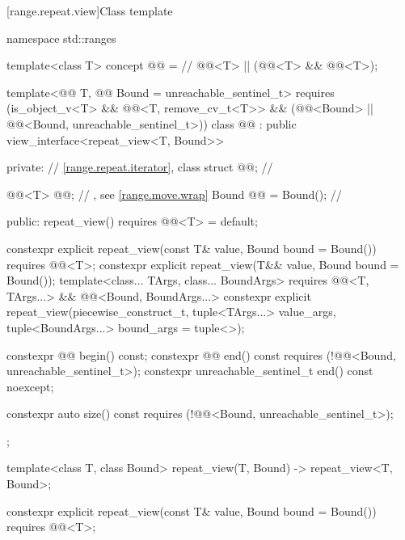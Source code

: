 [range.repeat.view]{Class template }

\begin{codeblock}
namespace std::ranges {
  template<class T>
    concept @@ =  // \expos
      @@<T> || (@@<T> && @@<T>);

  template<@@ T, @@ Bound = unreachable_sentinel_t>
    requires (is_object_v<T> && @@<T, remove_cv_t<T>> &&
              (@@<Bound> ||
               @@<Bound, unreachable_sentinel_t>))
  class @@ : public view_interface<repeat_view<T, Bound>> {
  private:
    // \ref{range.repeat.iterator}, class 
    struct @@;                            // \expos

    @@<T> @@;                      // \expos, see \ref{range.move.wrap}
    Bound @@ = Bound();                     // \expos

  public:
    repeat_view() requires @@<T> = default;

    constexpr explicit repeat_view(const T& value, Bound bound = Bound())
      requires @@<T>;
    constexpr explicit repeat_view(T&& value, Bound bound = Bound());
    template<class... TArgs, class... BoundArgs>
      requires @@<T, TArgs...> &&
               @@<Bound, BoundArgs...>
    constexpr explicit repeat_view(piecewise_construct_t,
      tuple<TArgs...> value_args, tuple<BoundArgs...> bound_args = tuple<>{});

    constexpr @@ begin() const;
    constexpr @@ end() const requires (!@@<Bound, unreachable_sentinel_t>);
    constexpr unreachable_sentinel_t end() const noexcept;

    constexpr auto size() const requires (!@@<Bound, unreachable_sentinel_t>);
  };

  template<class T, class Bound>
    repeat_view(T, Bound) -> repeat_view<T, Bound>;
}
\end{codeblock}

%
\begin{itemdecl}
constexpr explicit repeat_view(const T& value, Bound bound = Bound())
  requires @@<T>;
\end{itemdecl}

